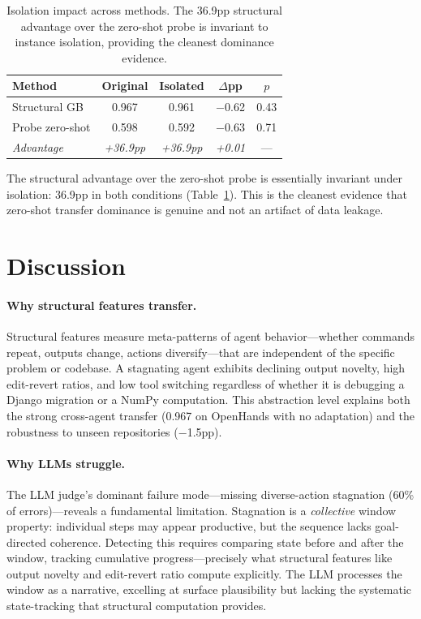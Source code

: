 \documentclass[11pt,a4paper]{article}
\begin{document}
\begin{table}[t]
\centering
\small
\begin{tabular}{lcccc}
\toprule
\textbf{Method} & \textbf{Original} & \textbf{Isolated} & \textbf{$\Delta$pp} & \textbf{$p$} \\
\midrule
Structural GB & 0.967 & 0.961 & $-$0.62 & 0.43 \\
Probe zero-shot & 0.598 & 0.592 & $-$0.63 & 0.71 \\
\midrule
\textit{Advantage} & \textit{+36.9pp} & \textit{+36.9pp} & \textit{+0.01} & --- \\
\bottomrule
\end{tabular}
\caption{Isolation impact across methods. The 36.9pp structural advantage over the zero-shot probe is invariant to instance isolation, providing the cleanest dominance evidence.}
\label{tab:isolation-methods}
\end{table}

The structural advantage over the zero-shot probe is essentially invariant under isolation: 36.9pp in both conditions (Table~\ref{tab:isolation-methods}).
This is the cleanest evidence that zero-shot transfer dominance is genuine and not an artifact of data leakage.

\section{Discussion}
\label{sec:discussion}

\paragraph{Why structural features transfer.}
Structural features measure meta-patterns of agent behavior---whether commands repeat, outputs change, actions diversify---that are independent of the specific problem or codebase.
A stagnating agent exhibits declining output novelty, high edit-revert ratios, and low tool switching regardless of whether it is debugging a Django migration or a NumPy computation.
This abstraction level explains both the strong cross-agent transfer (0.967 on OpenHands with no adaptation) and the robustness to unseen repositories ($-$1.5pp).

\paragraph{Why LLMs struggle.}
The LLM judge's dominant failure mode---missing diverse-action stagnation (60\% of errors)---reveals a fundamental limitation.
Stagnation is a \emph{collective} window property: individual steps may appear productive, but the sequence lacks goal-directed coherence.
Detecting this requires comparing state before and after the window, tracking cumulative progress---precisely what structural features like output novelty and edit-revert ratio compute explicitly.
The LLM processes the window as a narrative, excelling at surface plausibility but lacking the systematic state-tracking that structural computation provides.
\end{document}
